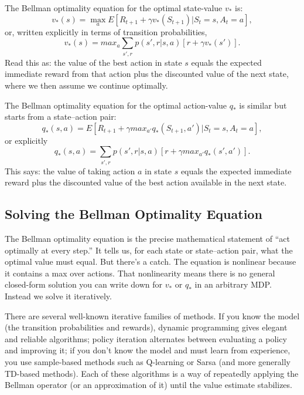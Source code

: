 The Bellman optimality equation for the optimal state-value $v_*$ is:
\begin{equation*}
    v_*(s) = \max_a E[R_{t+1}+\gamma v_*(S_{t+1})|S_t=s,A_t=a],    
\end{equation*}
or, written explicitly in terms of transition probabilities,
\begin{equation*}
    v_*(s) = max_a \sum_{s', r}p(s',r|s,a)[r+\gamma v_*(s')].
\end{equation*}
Read this as: the value of the best action in state $s$ equals the expected immediate reward from that action plus the discounted value of the next state, where we then assume we continue optimally.

The Bellman optimality equation for the optimal action-value $q_*$ is similar but starts from a state–action pair:
\begin{equation*}
    q_*(s,a) = E[R_{t+1}+\gamma max_{a'} q_*(S_{t+1},a')|S_t=s,A_t=a],    
\end{equation*}
or explicitly
\begin{equation*}
    q_*(s,a) = \sum_{s',r} p(s',r|s,a) [r+\gamma max_{a'} q_*(s',a')].
\end{equation*}
This says: the value of taking action $a$ in state $s$ equals the expected immediate reward plus the discounted value of the best action available in the next state.

\subsection{Solving the Bellman Optimality Equation}
The Bellman optimality equation is the precise mathematical statement of “act optimally at every step.” It tells us, for each state or state–action pair, what the optimal value must equal. But there’s a catch. The equation is nonlinear because it contains a max over actions. That nonlinearity means there is no general closed-form solution you can write down for $v_*$ or $q_*$ in an arbitrary MDP. Instead we solve it iteratively.

There are several well-known iterative families of methods. If you know the model (the transition probabilities and rewards), dynamic programming gives elegant and reliable algorithms; policy iteration alternates between evaluating a policy and improving it; if you don’t know the model and must learn from experience, you use sample-based methods such as Q-learning or Sarsa (and more generally TD-based methods). Each of these algorithms is a way of repeatedly applying the Bellman operator (or an approximation of it) until the value estimate stabilizes.

